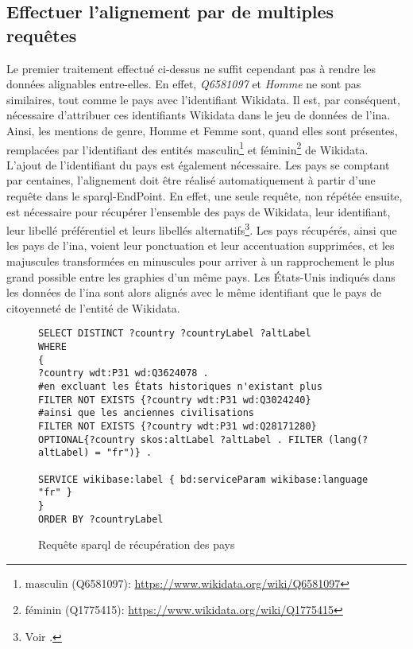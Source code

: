 \subsection{\label{II-C-2-c}Effectuer l'alignement par de multiples requêtes}

Le premier traitement effectué ci-dessus ne suffit cependant pas à rendre les données alignables entre-elles. En effet, \textit{Q6581097} et \textit{Homme} ne sont pas similaires, tout comme le pays avec l'identifiant Wikidata. Il est, par conséquent, nécessaire d'attribuer ces identifiants Wikidata dans le jeu de données de l'\ac{ina}. Ainsi, les mentions de genre, \og Homme\fg{} et \og Femme\fg{} sont, quand elles sont présentes, remplacées par l'identifiant des entités \og masculin\fg{}\footnote{masculin (Q6581097): \url{https://www.wikidata.org/wiki/Q6581097}} et \og féminin\fg{}\footnote{féminin (Q1775415): \url{https://www.wikidata.org/wiki/Q1775415}} de Wikidata.\\

L'ajout de l'identifiant du pays est également nécessaire. Les pays se comptant par centaines, l'alignement doit être réalisé automatiquement à partir d'une requête dans le \ac{sparql}-EndPoint. En effet, une seule requête, non répétée ensuite, est nécessaire pour récupérer l'ensemble des pays de Wikidata, leur identifiant, leur libellé préférentiel et leurs libellés alternatifs\footnote{Voir .}. Les pays récupérés, ainsi que les pays de l'\ac{ina}, voient leur ponctuation et leur accentuation supprimées, et les majuscules transformées en minuscules pour arriver à un rapprochement le plus grand possible entre les graphies d'un même pays. Les États-Unis indiqués dans les données de l'\ac{ina} sont alors alignés avec le même identifiant que le pays de citoyenneté de l'entité  de Wikidata.

\begin{figure}[!h]
	\centering
\begin{verbatim}
SELECT DISTINCT ?country ?countryLabel ?altLabel
WHERE
{
?country wdt:P31 wd:Q3624078 .
#en excluant les États historiques n'existant plus
FILTER NOT EXISTS {?country wdt:P31 wd:Q3024240}
#ainsi que les anciennes civilisations
FILTER NOT EXISTS {?country wdt:P31 wd:Q28171280}
OPTIONAL{?country skos:altLabel ?altLabel . FILTER (lang(?altLabel) = "fr")} .
		
SERVICE wikibase:label { bd:serviceParam wikibase:language "fr" }
}
ORDER BY ?countryLabel
\end{verbatim}
\caption{Requête \ac{sparql} de récupération des pays}
\label{sparql_pays}
\end{figure}

